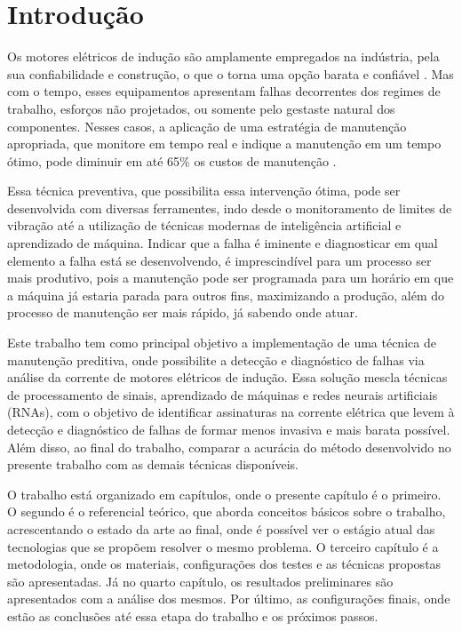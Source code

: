 
\chapter[Introdução]{Introdução}

Os motores elétricos de indução são amplamente empregados na indústria, pela sua confiabilidade e construção, o que o torna uma opção 
barata e confiável \cite{Umans2003}. Mas com o tempo, esses equipamentos apresentam falhas decorrentes dos regimes de trabalho, esforços não 
projetados, ou somente pelo gestaste natural dos componentes. Nesses casos, a aplicação de uma estratégia de manutenção apropriada, que
monitore em tempo real e indique a manutenção em um tempo ótimo, pode diminuir em até 65\% os custos de manutenção \cite{Wu2013}. 

Essa técnica preventiva, que possibilita essa intervenção ótima, pode ser desenvolvida com diversas ferramentes, indo desde o monitoramento
de limites de vibração até a utilização de técnicas modernas de inteligência artificial e aprendizado de máquina. Indicar que a falha é
iminente e diagnosticar em qual elemento a falha está se desenvolvendo, é imprescindível para um processo ser mais produtivo, pois 
a manutenção pode ser programada para um horário em que a máquina já estaria parada para outros fins, maximizando a produção, além do
processo de manutenção ser mais rápido, já sabendo onde atuar.

Este trabalho tem como principal objetivo a implementação de uma técnica de manutenção preditiva, onde possibilite a detecção e diagnóstico
de falhas via análise da corrente de motores elétricos de indução. Essa solução mescla técnicas de processamento de sinais, 
aprendizado de máquinas e redes neurais artificiais (RNAs), com o objetivo de identificar assinaturas na corrente elétrica que levem à
detecção e diagnóstico de falhas de formar menos invasiva e mais barata possível. Além disso, ao final do trabalho, comparar a acurácia 
do método desenvolvido no presente trabalho com as demais técnicas disponíveis.

O trabalho está organizado em capítulos, onde o presente capítulo é o primeiro. O segundo é o referencial teórico, que aborda conceitos
básicos sobre o trabalho, acrescentando o estado da arte ao final, onde é possível ver o estágio atual das tecnologias que se propõem 
resolver o mesmo problema. O terceiro capítulo é a metodologia, onde os materiais, configurações dos testes e as técnicas propostas são 
apresentadas. Já no quarto capítulo, os resultados preliminares são apresentados com a análise dos mesmos. Por último, as
configurações finais, onde estão as conclusões até essa etapa do trabalho e os próximos passos.




